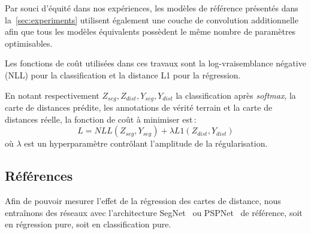 Par souci d'équité dans nos expériences, les modèles de référence présentés dans la~\cref{sec:experiments} utilisent également une couche de convolution additionnelle afin que tous les modèles équivalents possèdent le même nombre de paramètres optimisables.

Les fonctions de coût utilisées dans ces travaux sont la log-vraisemblance négative (NLL) pour la classification et la distance L1 pour la régression.

En notant respectivement $Z_{seg}, Z_{dist}, Y_{seg}, Y_{dist}$ la classification après \textit{softmax}, la carte de distances prédite, les annotations de vérité terrain et la carte de distances réelle, la fonction de coût à minimiser est\,:
\begin{equation}
L = NLL(Z_{seg}, Y_{seg}) + \lambda L1(Z_{dist}, Y_{dist})
\end{equation}
où $\lambda$ est un hyperparamètre contrôlant l'amplitude de la régularisation.

\subsection{Références}

Afin de pouvoir mesurer l'effet de la régression des cartes de distance, nous entraînons des réseaux avec l'architecture SegNet~\cite{badrinarayanan_segnet:_2017} ou PSPNet~\cite{zhao_pyramid_2017} de référence, soit en régression pure, soit en classification pure.

